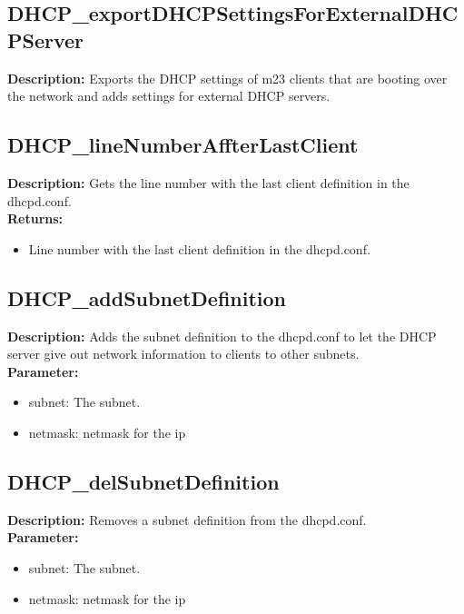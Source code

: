 \subsection{DHCP\_exportDHCPSettingsForExternalDHCPServer}
\textbf{Description:} Exports the DHCP settings of m23 clients that are booting over the network and adds settings for external DHCP servers.\\

\subsection{DHCP\_lineNumberAffterLastClient}
\textbf{Description:} Gets the line number with the last client definition in the dhcpd.conf.\\
\textbf{Returns:}
\begin{itemize}
\item Line number with the last client definition in the dhcpd.conf.
\end{itemize}

\subsection{DHCP\_addSubnetDefinition}
\textbf{Description:} Adds the subnet definition to the dhcpd.conf to let the DHCP server give out network information to clients to other subnets.\\
\textbf{Parameter:}
\begin{itemize}
\item subnet: The subnet.
\item netmask: netmask for the ip
\end{itemize}

\subsection{DHCP\_delSubnetDefinition}
\textbf{Description:} Removes a subnet definition from the dhcpd.conf.\\
\textbf{Parameter:}
\begin{itemize}
\item subnet: The subnet.
\item netmask: netmask for the ip
\end{itemize}

